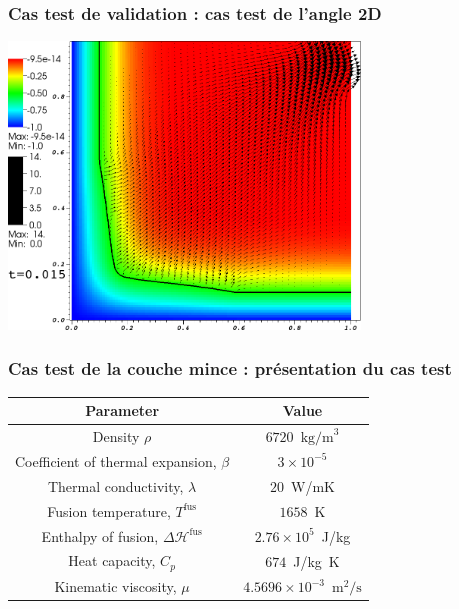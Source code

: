 \documentclass{beamer}
\newcommand{\fus}{\text{fus}}
\begin{document}
\begin{frame}
    \frametitle{Cas test de validation : cas test de l'angle 2D}
	\tiny
\begin{center}

\includegraphics[width=0.7\textwidth]{Figures/AngleTfusTsol_0_0150000.png}
\end{center}

\end{frame}

\begin{frame}
    \frametitle{Cas test de la couche mince : présentation du cas test}
    \footnotesize
\begin{figure}[h]
\centering
\begin{tikzpicture}[scale =0.5, every node/.style={scale=0.7}]

\end{tikzpicture}
\begin{tikzpicture}[scale =0.3, every node/.style={scale=0.4}]

\end{tikzpicture}
\label{fig:configCoucheMince}
\end{figure}


\begin{table}[!h]
	\centering
	\tiny
		\begin{tabular}{|c|c|}
		\hline
		Parameter & Value\\
		\hline \hline
		Density $\rho$ & $6720$~$\text{kg/m}^3$\\	
		Coefficient of thermal expansion, $\beta$ & $3\times 10^{-5}$\\
		Thermal conductivity, $\lambda$ & $20$~W/mK\\
		Fusion temperature, $T^\fus$ & $1658$~K\\
		Enthalpy of fusion, $\Delta \mathcal{H}^\fus$ & $2.76\times 10^5$~J/kg\\
		Heat capacity, $C_p$ & $674$~J/kg~K\\
		Kinematic viscosity, $\mu$ & $4.5696 \times 10^{-3}$~$\text{m}^2/\text{s}$\\
		\hline
		\end{tabular}%
	\label{tab:Acier}
\end{table}
\end{frame}
\end{document}
